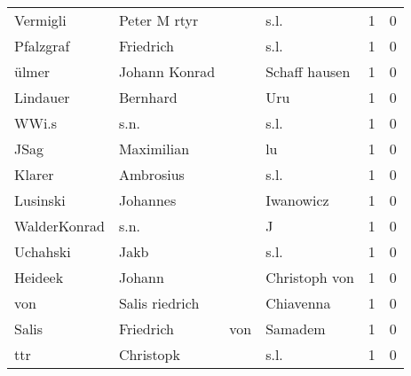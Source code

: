 \begin{tabular}{llllrr}
                 Vermigli &                       Peter M rtyr &             &                                        s.l. &          1 &         0 \\
                Pfalzgraf &                          Friedrich &             &                                        s.l. &          1 &         0 \\
                    ülmer &                      Johann Konrad &             &                               Schaff hausen &          1 &         0 \\
                 Lindauer &                           Bernhard &             &                                         Uru &          1 &         0 \\
                    WWi.s &                               s.n. &             &                                        s.l. &          1 &         0 \\
                     JSag &                         Maximilian &             &                                          lu &          1 &         0 \\
                   Klarer &                          Ambrosius &             &                                        s.l. &          1 &         0 \\
                 Lusinski &                           Johannes &             &                                   Iwanowicz &          1 &         0 \\
             WalderKonrad &                               s.n. &             &                                           J &          1 &         0 \\
                 Uchahski &                               Jakb &             &                                        s.l. &          1 &         0 \\
                  Heideek &                             Johann &             &                               Christoph von &          1 &         0 \\
                      von &                     Salis riedrich &             &                                   Chiavenna &          1 &         0 \\
                    Salis &                          Friedrich &         von &                                     Samadem &          1 &         0 \\
                      ttr &                          Christopk &             &                                        s.l. &          1 &         0 \\

\end{tabular}
